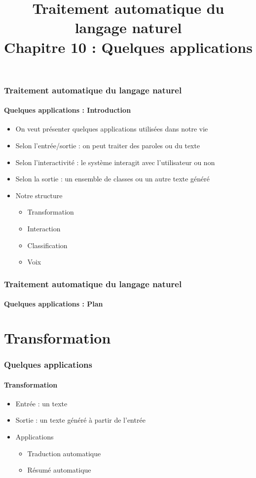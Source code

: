 \documentclass[xcolor=table]{beamer}
\title[TALN : 10- Quelques applications]%
{Traitement automatique du langage naturel\\Chapitre 10 : Quelques applications}
\begin{document}
	
\begin{frame}
\frametitle{Traitement automatique du langage naturel}
\framesubtitle{Quelques applications : Introduction}

	\begin{itemize}
		\item On veut présenter quelques applications utilisées dans notre vie
		\item Selon l'entrée/sortie : on peut traiter des paroles ou du texte
		\item Selon l'interactivité : le système interagit avec l'utilisateur ou non
		\item Selon la sortie : un ensemble de classes ou un autre texte généré
		\item Notre structure 
		\begin{itemize}
			\item Transformation
			\item Interaction
			\item Classification
			\item Voix
		\end{itemize}
	\end{itemize}

\end{frame}

%
%

\begin{frame}
\frametitle{Traitement automatique du langage naturel}
\framesubtitle{Quelques applications : Plan}

\begin{multicols}{2}
\tableofcontents
\end{multicols}
\end{frame}

\section{Transformation}

\begin{frame}
	\frametitle{Quelques applications}
	\framesubtitle{Transformation}
	\begin{itemize}
		\item Entrée : un texte 
		\item Sortie : un texte généré à partir de l'entrée
		\item Applications 
		\begin{itemize}
			\item Traduction automatique
			\item Résumé automatique
		\end{itemize}
	\end{itemize}
\end{frame}
\end{document}
